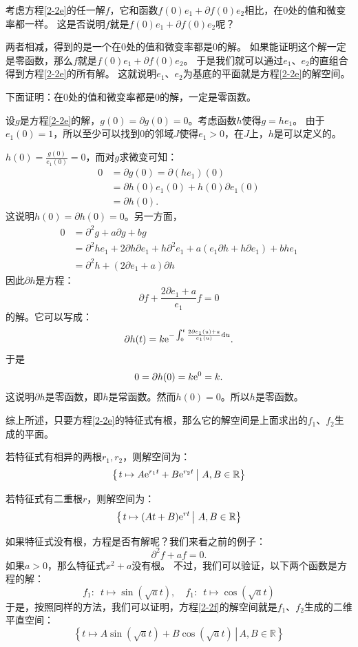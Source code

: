 \documentclass[12pt,UTF8]{ctexbook}
\begin{document}
考虑方程\eqref{2-2e}的任一解$f$，它和函数$f(0)e_1 + \partial f(0) e_2$相比，在$0$处的值和微变率都一样。
这是否说明$f$就是$f(0)e_1 + \partial f(0) e_2$呢？

两者相减，得到的是一个在$0$处的值和微变率都是$0$的解。
如果能证明这个解一定是零函数，那么$f$就是$f(0)e_1 + \partial f(0) e_2$。
于是我们就可以通过$e_1$、$e_2$的直组合得到方程\eqref{2-2e}的所有解。
这就说明$e_1$、$e_2$为基底的平面就是方程\eqref{2-2e}的解空间。

下面证明：在$0$处的值和微变率都是$0$的解，一定是零函数。

设$g$是方程\eqref{2-2e}的解，$g(0) = \partial g(0) = 0$。考虑函数$h$使得$g = he_1$。
由于$e_1(0) = 1$，所以至少可以找到$0$的邻域$J$使得$e_1 > 0$，在$J$上，$h$是可以定义的。

$h(0) = \frac{g(0)}{e_1(0)} = 0$，而对$g$求微变可知：
\begin{align*}
    0 &= \partial g(0) = \partial (he_1) (0) \\
    &= \partial h (0) e_1(0) + h (0) \partial e_1(0) \\
    &= \partial h (0).
\end{align*}
这说明$h(0) = \partial h(0) = 0$。另一方面，
\begin{align*}
    0 &= \partial^2 g + a \partial g + b g \\
    &= \partial^2 h e_1 + 2 \partial h \partial e_1 + h \partial^2 e_1 + a(e_1\partial h + h \partial e_1) + b h e_1 \\
    &= \partial^2 h  + (2 \partial e_1 + a) \partial h
\end{align*}
因此$\partial h$是方程：
$$ \partial f + \frac{2 \partial e_1 + a}{e_1} f = 0 $$
的解。它可以写成：
$$ \partial h (t) = k \mathrm{e}^{-\int_0^t \frac{2 \partial e_1(u) + a}{e_1(u)} \mathrm{d}u}. $$
于是
$$0 = \partial h (0) = k \mathrm{e}^0 = k.$$
这说明$\partial h$是零函数，即$h$是常函数。然而$h(0) = 0$。所以$h$是零函数。

综上所述，只要方程\eqref{2-2e}的特征式有根，那么它的解空间是上面求出的$f_1$、$f_2$生成的平面。

若特征式有相异的两根$r_1, r_2$，则解空间为：
$$ \left\{\left.t \mapsto A\mathrm{e}^{r_1t} + B\mathrm{e}^{r_2t}\,\right|\, A, B \in \mathbb{R}\right\}$$

若特征式有二重根$r$，则解空间为：
$$ \left\{\left.t \mapsto (At + B)\mathrm{e}^{rt}\,\right|\, A, B \in \mathbb{R}\right\}$$

如果特征式没有根，方程是否有解呢？我们来看之前的例子：
\begin{equation}
    \partial^2 f + af = 0. \label{2-2f}
\end{equation}
如果$a>0$，那么特征式$x^2 + a$没有根。
不过，我们可以验证，以下两个函数是方程的解：
$$ f_1: \,\,\, t\mapsto \sin{(\sqrt{a}t)}, \quad f_1: \,\,\, t\mapsto \cos{(\sqrt{a}t)} $$
于是，按照同样的方法，我们可以证明，方程\eqref{2-2f}的解空间就是$f_1$、$f_2$生成的二维平直空间：
$$ \left\{\left.t \mapsto A\sin{(\sqrt{a}t)} + B\cos{(\sqrt{a}t)}\,\right|\, A, B \in \mathbb{R}\right\}$$
\end{document}
